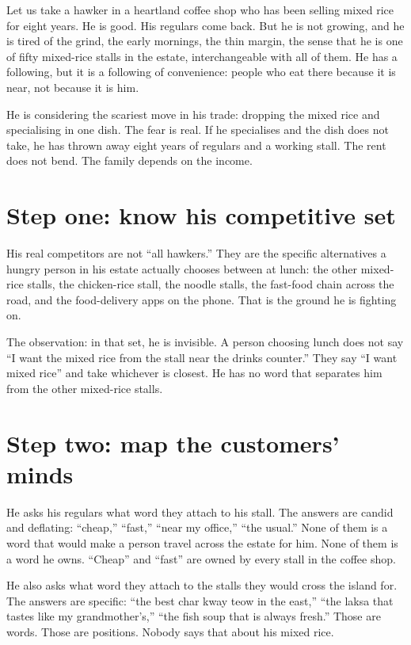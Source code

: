\documentclass[10pt,twoside,openany]{memoir}
\newcommand{\needspacehead}{\needspace{4\baselineskip}}
\let\oldsection\section
\renewcommand{\section}{\needspacehead\oldsection}
\begin{document}
{Let us take a hawker in a heartland coffee shop who has been selling
mixed rice for eight years. He is good. His regulars come back. But he
is not growing, and he is tired of the grind, the early mornings, the
thin margin, the sense that he is one of fifty mixed-rice stalls in the
estate, interchangeable with all of them. He has a following, but it is
a following of convenience: people who eat there because it is near, not
because it is him.

He is considering the scariest move in his trade: dropping the mixed
rice and specialising in one dish. The fear is real. If he specialises
and the dish does not take, he has thrown away eight years of regulars
and a working stall. The rent does not bend. The family depends on the
income.

\section{Step one: know his competitive
set}\label{step-one-know-his-competitive-set}

His real competitors are not ``all hawkers.'' They are the specific
alternatives a hungry person in his estate actually chooses between at
lunch: the other mixed-rice stalls, the chicken-rice stall, the noodle
stalls, the fast-food chain across the road, and the food-delivery apps
on the phone. That is the ground he is fighting on.

The observation: in that set, he is invisible. A person choosing lunch
does not say ``I want the mixed rice from the stall near the drinks
counter.'' They say ``I want mixed rice'' and take whichever is closest.
He has no word that separates him from the other mixed-rice stalls.

\section{Step two: map the customers'
minds}\label{step-two-map-the-customers-minds}

He asks his regulars what word they attach to his stall. The answers are
candid and deflating: ``cheap,'' ``fast,'' ``near my office,'' ``the
usual.'' None of them is a word that would make a person travel across
the estate for him. None of them is a word he owns. ``Cheap'' and
``fast'' are owned by every stall in the coffee shop.

He also asks what word they attach to the stalls they would cross the
island for. The answers are specific: ``the best char kway teow in the
east,'' ``the laksa that tastes like my grandmother's,'' ``the fish soup
that is always fresh.'' Those are words. Those are positions. Nobody
says that about his mixed rice.

}
\end{document}

